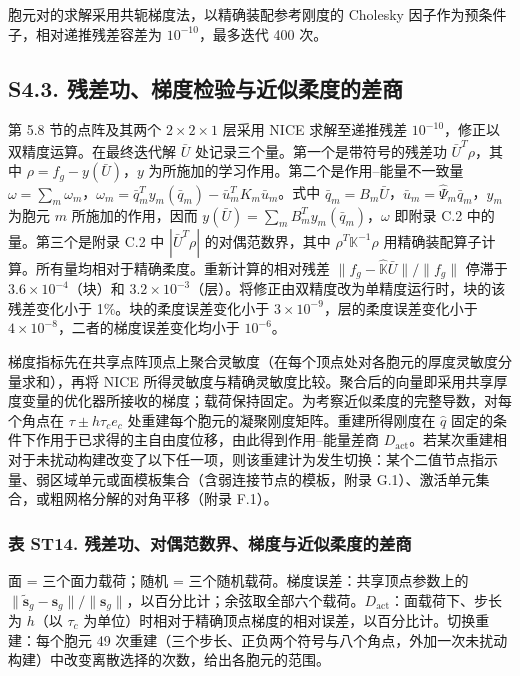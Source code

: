\documentclass[preprint,12pt,authoryear]{elsarticle}
\begin{document}
胞元对的求解采用共轭梯度法，以精确装配参考刚度的 Cholesky 因子作为预条件子，相对递推残差容差为 \(10^{-10}\)，最多迭代 400 次。

\subsection{S4.3. 残差功、梯度检验与近似柔度的差商}

第 5.8 节的点阵及其两个 \(2\times2\times1\) 层采用 NICE 求解至递推残差 \(10^{-10}\)，修正以双精度运算。在最终迭代解 \(\bar U\) 处记录三个量。第一个是带符号的残差功 \(\bar U^T\rho\)，其中 \(\rho=f_g-y(\bar U)\)，\(y\) 为所施加的学习作用。第二个是作用--能量不一致量 \(\omega=\sum_m\omega_m\)，\(\omega_m=\bar q_m^Ty_m(\bar q_m)-\bar u_m^TK_m\bar u_m\)。式中 \(\bar q_m=B_m\bar U\)，\(\bar u_m=\widehat\Psi_m\bar q_m\)，\(y_m\) 为胞元 \(m\) 所施加的作用，因而 \(y(\bar U)=\sum_mB_m^Ty_m(\bar q_m)\)，\(\omega\) 即附录 C.2 中的量。第三个是附录 C.2 中 \(|\bar U^T\rho|\) 的对偶范数界，其中 \(\rho^T\mathbb K^{-1}\rho\) 用精确装配算子计算。所有量均相对于精确柔度。重新计算的相对残差 \(\|f_g-\widehat{\mathbb K}\bar U\|/\|f_g\|\) 停滞于 \(3.6\times10^{-4}\)（块）和 \(3.2\times10^{-3}\)（层）。将修正由双精度改为单精度运行时，块的该残差变化小于 1\%。块的柔度误差变化小于 \(3\times10^{-9}\)，层的柔度误差变化小于 \(4\times10^{-8}\)，二者的梯度误差变化均小于 \(10^{-6}\)。

梯度指标先在共享点阵顶点上聚合灵敏度（在每个顶点处对各胞元的厚度灵敏度分量求和），再将 NICE 所得灵敏度与精确灵敏度比较。聚合后的向量即采用共享厚度变量的优化器所接收的梯度；载荷保持固定。为考察近似柔度的完整导数，对每个角点在 \(\tau\pm h\tau_ce_c\) 处重建每个胞元的凝聚刚度矩阵。重建所得刚度在 \(\widehat q\) 固定的条件下作用于已求得的主自由度位移，由此得到作用--能量差商 \(D_{\mathrm{act}}\)。若某次重建相对于未扰动构建改变了以下任一项，则该重建计为发生切换：某个二值节点指示量、弱区域单元或面模板集合（含弱连接节点的模板，附录 G.1）、激活单元集合，或粗网格分解的对角平移（附录 F.1）。

\subsubsection{表 ST14. 残差功、对偶范数界、梯度与近似柔度的差商}

面 = 三个面力载荷；随机 = 三个随机载荷。梯度误差：共享顶点参数上的 \(\|\widetilde{\boldsymbol s}_g-\boldsymbol s_g\|/\|\boldsymbol s_g\|\)，以百分比计；余弦取全部六个载荷。\(D_{\mathrm{act}}\)：面载荷下、步长为 \(h\)（以 \(\tau_c\) 为单位）时相对于精确顶点梯度的相对误差，以百分比计。切换重建：每个胞元 49 次重建（三个步长、正负两个符号与八个角点，外加一次未扰动构建）中改变离散选择的次数，给出各胞元的范围。
\end{document}
